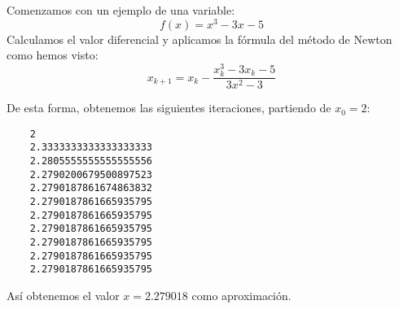 \begin{example}
	
Comenzamos con un ejemplo de una variable:
$$f(x) = x^3 - 3x - 5$$
Calculamos el valor diferencial y aplicamos la fórmula del método de Newton como hemos visto:
$$x_{k+1} = x_{k} - \frac{ x_k^3 - 3x_k - 5}{3x^2-3}$$

De esta forma, obtenemos las siguientes iteraciones, partiendo de $x_0 = 2$:
\begin{verbatim}
	2
	2.3333333333333333333
	2.2805555555555555556
	2.2790200679500897523
	2.2790187861674863832
	2.2790187861665935795
	2.2790187861665935795
	2.2790187861665935795
	2.2790187861665935795
	2.2790187861665935795
	2.2790187861665935795
\end{verbatim}
Así obtenemos el valor $x = 2.279018$ como aproximación.

\end{example}

